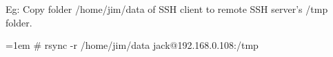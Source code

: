 \begin{flushleft}
\begin{itemize}
	\bigskip
	Eg: Copy folder /home/jim/data of SSH client to remote SSH server's /tmp folder.
	\begin{tcolorbox}[breakable,notitle,boxrule=-0pt,colback=black,colframe=black]
		\color{green}
		\font=1em
		\# rsync -r /home/jim/data  jack@192.168.0.108:/tmp
		\font=4pt
	\end{tcolorbox}
		
\end{itemize}

\end{flushleft}
\newpage


